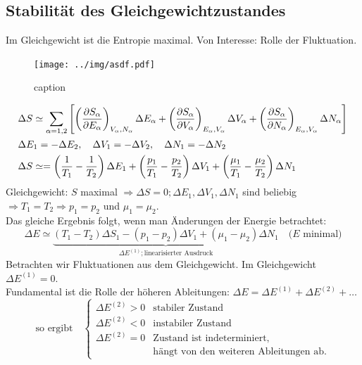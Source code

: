 \subsection{Stabilität des Gleichgewichtzustandes}
Im Gleichgewicht ist die Entropie maximal. Von Interesse: Rolle der Fluktuation.
\begin{figure}[H]
    \begin{center}
        \texttt{[image: ../img/asdf.pdf]}
        \caption{caption}
        \label{img:label}
    \end{center}
\end{figure}
\begin{equation}
    \begin{split}
        & \Delta S \simeq \sum_{\alpha = 1, 2} \left[ \left( \frac{\partial S_\alpha}{\partial E_\alpha} \right)_{V_\alpha, N_\alpha} \Delta E_\alpha
        + \left( \frac{\partial S_\alpha}{\partial V_\alpha} \right)_{E_\alpha, V_\alpha} \Delta V_\alpha + \left( \frac{\partial S_\alpha}{\partial N_\alpha} \right)_{E_\alpha, V_\alpha} \Delta N_\alpha \right] \\
        & \Delta E_1 = - \Delta E_2, \quad \Delta V_1 = - \Delta V_2, \quad \Delta N_1 = - \Delta N_2 \\
        & \Delta S \simeq = \left( \frac{1}{T_1} - \frac{1}{T_2} \right) \Delta E_1 + \left( \frac{p_1}{T_1}
        - \frac{p_2}{T_2} \right) \Delta V_1 + \left( \frac{\mu_1}{T_1} - \frac{\mu_2}{T_2} \right) \Delta N_1
    \end{split}
\end{equation}
Gleichgewicht: $S$ maximal $\Rightarrow \Delta S = 0; \Delta E_1, \Delta V_1, \Delta N_1$ sind beliebig
$\Rightarrow T_1 = T_2 \Rightarrow p_1 = p_2$ und $\mu_1 = \mu_2$. \\
Das gleiche Ergebnis folgt, wenn man Änderungen der Energie betrachtet:
\begin{equation}
    \Delta E \simeq \underbrace{\left( T_1 - T_2 \right)  \Delta S_1 - \left( p_1 - p_2 \right) \Delta V_1 + \left( \mu_1 - \mu_2 \right) \Delta N_1}_{\Delta E^{(1)}; \text{linearisierter Ausdruck}} \quad \text{($E$ minimal)}
\end{equation}
Betrachten wir Fluktuationen aus dem Gleichgewicht. Im Gleichgewicht $\Delta E^{(1)} = 0$. \\
Fundamental ist die Rolle der höheren Ableitungen: $\Delta E = \Delta E^{(1)} + \Delta E^{(2)} + \ldots$
\begin{equation}
    \text{so ergibt} \quad
    \begin{cases}
        \Delta E^{(2)} > 0 & \text{stabiler Zustand} \\
        \Delta E^{(2)} < 0 & \text{instabiler Zustand} \\
        \Delta E^{(2)} = 0 & \text{Zustand ist indeterminiert,} \\
        & \text{hängt von den weiteren Ableitungen ab.}
    \end{cases}
\end{equation}
